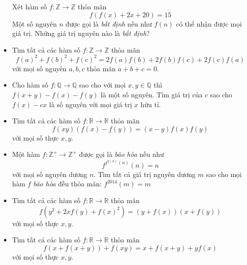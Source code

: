 \documentclass[11pt]{scrartcl}
\begin{document}
\begin{itemize}[label=, leftmargin=0em, itemsep=-0em]
\begin{btvn}
        Xét hàm số $f: \mathbb{Z} \to \mathbb{Z}$ thỏa mãn
        \[
           f(f(x) + 2x + 20) = 15
        \]
        Một số nguyên $n$ được gọi là \textit{bất định} nếu như $f(n)$ có thể nhận được mọi giá trị. Những giá trị nguyên nào là \textit{bất định}?
    \end{btvn}
    \item \begin{btvn}
        Tìm tất cả các hàm số $f: \mathbb{Z} \to \mathbb{Z}$ thỏa mãn
        \[
          f(a)^2 + f(b)^2 + f(c)^2 = 2f(a)f(b) + 2f(b)f(c) + 2f(c)f(a)
        \]
        với mọi số nguyên $a,b,c$ thỏa mãn $a + b + c = 0$.
    \end{btvn}
    \item \begin{btvn}
        Cho hàm số $f: \mathbb{Q} \to \mathbb{Q}$ sao cho với mọi $x,y \in \mathbb{Q}$ thì $f(x + y) - f(x) -f(y)$ là một số nguyên. Tìm giá trị của $c$ sao cho $f(x) - cx$ là số nguyên với mọi giá trị $x$ hữu tỉ.
    \end{btvn}
    \item \begin{btvn}
        Tìm tất cả các hàm số $f: \mathbb{R} \to \mathbb{R}$ thỏa mãn
        \[
            f(xy)(f(x) - f(y)) =(x-y)f(x)f(y)
        \]
        với mọi số thực $x,y$.
    \end{btvn}
    \item \begin{btvn}
        Một hàm $f: \mathbb{Z}^+ \to \mathbb{Z}^+$ được gọi là \textit{bão hòa} nếu như
        \[
            f^{f^{f(n)}(n)}(n) = n
        \]
        với mọi số nguyên dương $n$. Tìm tất cả giá trị nguyên dương $m$ sao cho mọi hàm $f$ \textit{bão hòa} đều thỏa mãn: $f^{2014}(m) = m $
    \end{btvn}
    \item \begin{btvn}
        Tìm tất cả các hàm số $f: \mathbb{R} \to \mathbb{R}$ thỏa mãn
        \[
           f(y^2 + 2xf(y) + f(x)^2) = (y + f(x))(x + f(y))
        \]
        với mọi số thực $x,y$.
    \end{btvn}
    \item \begin{btvn}
        Tìm tất cả các hàm số $f: \mathbb{R} \to \mathbb{R}$ thỏa mãn
        \[
           f(x + f(x + y)) + f(xy) = x + f(x + y) + yf(x)
        \]
        với mọi số thực $x,y$.
    \end{btvn}

\end{itemize}
\end{document}
